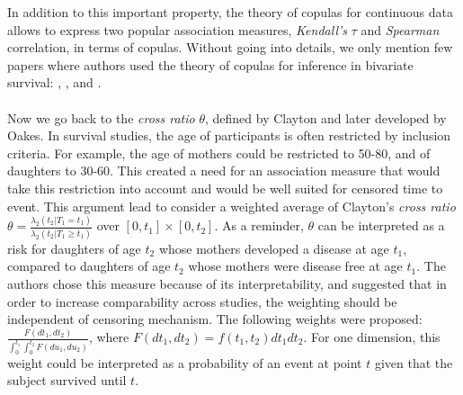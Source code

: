 \documentclass[]{article}
\begin{document}
In addition to this important property, the theory of copulas for continuous data allows to express two popular association measures, \emph{Kendall's} $\tau$ and \emph{Spearman} correlation, in terms of copulas. Without going into details, we only mention few papers where authors used the theory of copulas for inference in bivariate survival: \cite{shih1996tests}, \cite{shih1995inferences}, and \cite{zhang2008inference}.\\
~\\
Now we go back to the \emph{cross ratio} $\theta$, defined by Clayton and later developed by Oakes. In survival studies, the age of participants is often restricted by inclusion criteria. For example, the age of mothers could be restricted to 50-80, and of daughters to 30-60. This created a need for an association measure that would take this restriction into account and would be well suited for censored time to event. This argument lead \cite{fan2000dependence} to consider a weighted average of Clayton's \textit{cross ratio} $\theta = \frac{ \lambda_2(t_2|T_1=t_1)}{\lambda_2(t_2|T_1 \geq t_1)}$ over $[0,t_1] \times [0, t_2]$. As a reminder, $\theta$ can be interpreted as a risk for daughters of age $t_2$ whose mothers developed a disease at age $t_1$, compared to daughters of age $t_2$ whose mothers were disease free at age $t_1$. The authors chose this measure because of its interpretability, and suggested that in order to increase comparability across studies, the weighting should be independent of censoring mechanism. The following weights were proposed: $\frac{F(dt_1,dt_2)}{\int_0^{t_1}\int_0^{t_2} F(du_1, du_2)}$, where $F(dt_1,dt_2) = f(t_1,t_2)dt_1dt_2 $. For one dimension, this weight could be interpreted as a probability of an event at point $t$ given that the subject survived until $t$.\\
\end{document}
